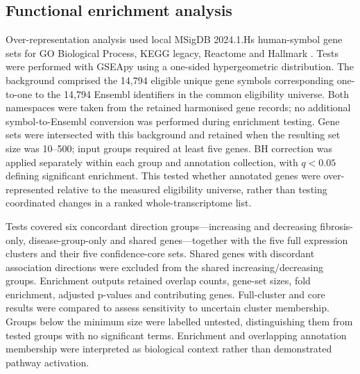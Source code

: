 \documentclass[11pt,a4paper]{article}
\begin{document}
\subsection*{Functional enrichment analysis}
Over-representation analysis used local MSigDB 2024.1.Hs human-symbol gene sets for GO Biological Process, KEGG legacy, Reactome and Hallmark \cite{ref12}. Tests were performed with GSEApy \cite{ref13} using a one-sided hypergeometric distribution. The background comprised the 14,794 eligible unique gene symbols corresponding one-to-one to the 14,794 Ensembl identifiers in the common eligibility universe. Both namespaces were taken from the retained harmonised gene records; no additional symbol-to-Ensembl conversion was performed during enrichment testing. Gene sets were intersected with this background and retained when the resulting set size was 10--500; input groups required at least five genes. BH correction was applied separately within each group and annotation collection, with \(q<0.05\) defining significant enrichment. This tested whether annotated genes were over-represented relative to the measured eligibility universe, rather than testing coordinated changes in a ranked whole-transcriptome list.

Tests covered six concordant direction groups---increasing and decreasing fibrosis-only, disease-group-only and shared genes---together with the five full expression clusters and their five confidence-core sets. Shared genes with discordant association directions were excluded from the shared increasing/decreasing groups. Enrichment outputs retained overlap counts, gene-set sizes, fold enrichment, adjusted p-values and contributing genes. Full-cluster and core results were compared to assess sensitivity to uncertain cluster membership. Groups below the minimum size were labelled untested, distinguishing them from tested groups with no significant terms. Enrichment and overlapping annotation membership were interpreted as biological context rather than demonstrated pathway activation.
\end{document}
